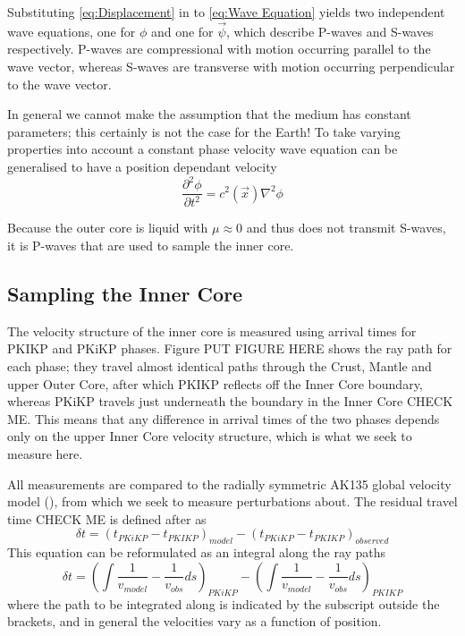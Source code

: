 \documentclass[11pt,a4paper]{article}
\begin{document}
Substituting \eqref{eq:Displacement} in to \eqref{eq:Wave Equation} yields two independent wave equations, one for $\phi$ and one for $\vec{\psi}$, which describe P-waves and S-waves respectively. P-waves are compressional with motion occurring parallel to the wave vector, whereas S-waves are transverse with motion occurring perpendicular to the wave vector.

In general we cannot make the assumption that the medium has constant parameters; this certainly is not the case for the Earth! To take varying properties into account a constant phase velocity wave equation can be generalised to have a position dependant velocity
\begin{equation}
	\frac{\partial^{2} \phi}{\partial t^{2}} = c^{2} \left ( \vec{x} \right ) \nabla^{2} \phi
\end{equation}

Because the outer core is liquid with $\mu \approx 0$ and thus does not transmit S-waves, it is P-waves that are used to sample the inner core.

\subsection{Sampling the Inner Core}
The velocity structure of the inner core is measured using arrival times for PKIKP and PKiKP phases. Figure PUT FIGURE HERE shows the ray path for each phase; they travel almost identical paths through the Crust, Mantle and upper Outer Core, after which PKIKP reflects off the Inner Core boundary, whereas PKiKP travels just underneath the boundary in the Inner Core CHECK ME. This means that any difference in arrival times of the two phases depends only on the upper Inner Core velocity structure, which is what we seek to measure here.

All measurements are compared to the radially symmetric AK135 global velocity model (\cite{Kennett1995b}), from which we seek to measure perturbations about. The residual travel time CHECK ME is defined after \cite{Waszek2011a} as
\begin{equation}
	\delta t = \left ( t_{PKiKP} - t_{PKIKP} \right )_{model} -  \left ( t_{PKiKP} - t_{PKIKP} \right )_{observed}
\end{equation}
This equation can be reformulated as an integral along the ray paths
\begin{equation}
		\delta t = \left (  \int \frac{1}{v_{model}} - \frac{1}{v_{obs}} ds  \right )_{PKiKP} - \left (  \int \frac{1}{v_{model}} - \frac{1}{v_{obs}} ds \right )_{PKIKP}
		\label{eq:deltat}
\end{equation}
where the path to be integrated along is indicated by the subscript outside the brackets, and in general the velocities vary as a function of position.
\end{document}
